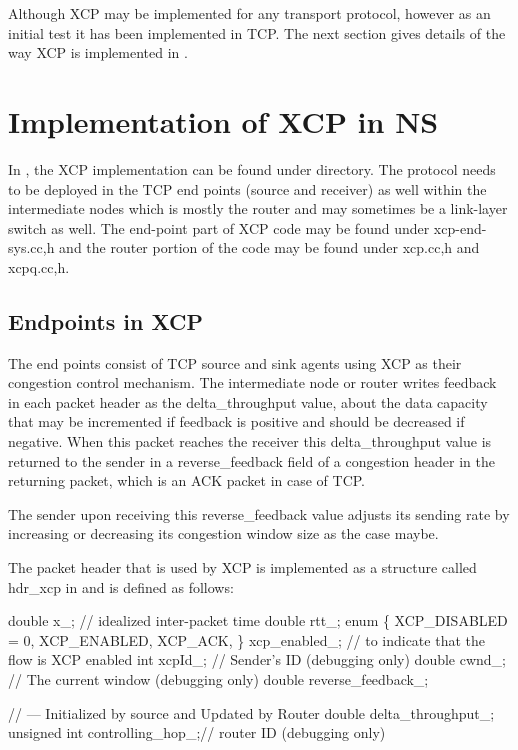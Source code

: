 Although XCP may be implemented for any transport protocol, however as an
initial test it has been implemented in TCP. The next section
gives details of the way XCP is implemented in \ns{}.


\section{Implementation of XCP in NS}
\label{sec:xcp in ns}

In \ns{}, the XCP implementation can be found under  directory. 
The protocol needs to be deployed in the TCP end points (source and
receiver) as well within the intermediate nodes which is mostly the
router and may sometimes be a link-layer switch as well. The end-point
part of XCP code may be found under xcp-end-sys.{cc,h} and the router
portion of the code may be found under xcp.{cc,h} and xcpq.{cc,h}. 

\subsection{Endpoints in XCP}
\label{sec:endpoints}

The end points consist of TCP source and sink agents using XCP as their
congestion control mechanism. The
intermediate node or router writes feedback in each packet header as
the delta\_throughput value, about the data capacity that may be
incremented if feedback is positive and should be decreased if
negative. When this packet reaches the receiver this delta\_throughput
value is returned to the sender in a reverse\_feedback field of a
congestion header in the returning packet, which is an ACK packet in
case of TCP. 
  
The sender upon receiving this reverse\_feedback value adjusts its
sending rate by increasing or decreasing its congestion window size as
the case maybe. 

The packet header that is used by XCP is implemented as a structure
called hdr\_xcp in \ns{} and is defined as follows:
\begin{program}
  double	x_;					// idealized inter-packet time
  double	rtt_;
  enum \{
    XCP_DISABLED = 0,
    XCP_ENABLED,
    XCP_ACK,
  \} 		xcp_enabled_;		// to indicate that the flow is XCP enabled
  int	    xcpId_;				// Sender's ID (debugging only)
  double	cwnd_;				// The current window (debugging only) 
  double	reverse_feedback_; 
  
  // --- Initialized by source and Updated by Router 
  double 	delta_throughput_;
  unsigned int controlling_hop_;// router ID (debugging only)
\end{program}
  
